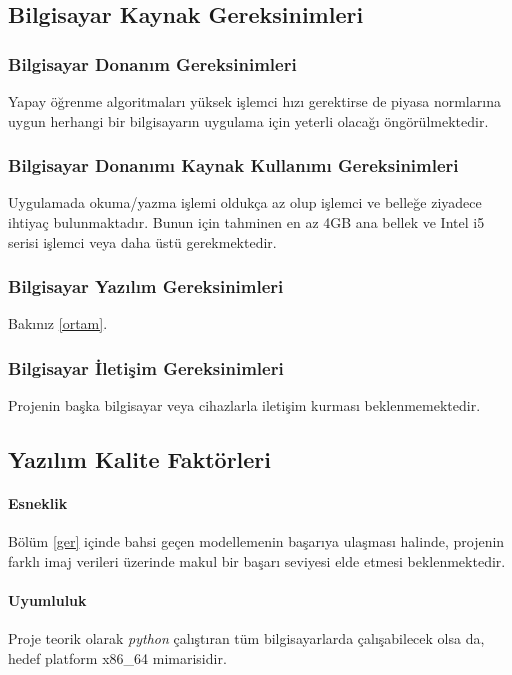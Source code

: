 \documentclass[12pt,a4paper]{article}
\begin{document}
   \subsection{Bilgisayar Kaynak Gereksinimleri}
   \subsubsection{Bilgisayar Donanım Gereksinimleri}
   Yapay öğrenme algoritmaları yüksek işlemci hızı gerektirse de piyasa normlarına uygun herhangi bir bilgisayarın uygulama için yeterli olacağı öngörülmektedir.

   \subsubsection{Bilgisayar Donanımı Kaynak Kullanımı Gereksinimleri}
   Uygulamada okuma/yazma işlemi oldukça az olup işlemci ve belleğe ziyadece ihtiyaç bulunmaktadır. Bunun için tahminen en az 4GB ana bellek ve Intel i5 serisi işlemci veya daha üstü gerekmektedir.

   \subsubsection{Bilgisayar Yazılım Gereksinimleri}
   Bakınız \ref{ortam}.
   
   \subsubsection{Bilgisayar İletişim Gereksinimleri}
   Projenin başka bilgisayar veya cihazlarla iletişim kurması beklenmemektedir.

   \subsection{Yazılım Kalite Faktörleri}

   \paragraph{Esneklik}
   Bölüm \ref{ger} içinde bahsi geçen modellemenin başarıya ulaşması halinde, projenin farklı imaj verileri üzerinde makul bir başarı seviyesi elde etmesi beklenmektedir.

   \paragraph{Uyumluluk}
   Proje teorik olarak \textit{python} çalıştıran tüm bilgisayarlarda çalışabilecek olsa da, hedef platform x86\_64 mimarisidir.
\end{document}

